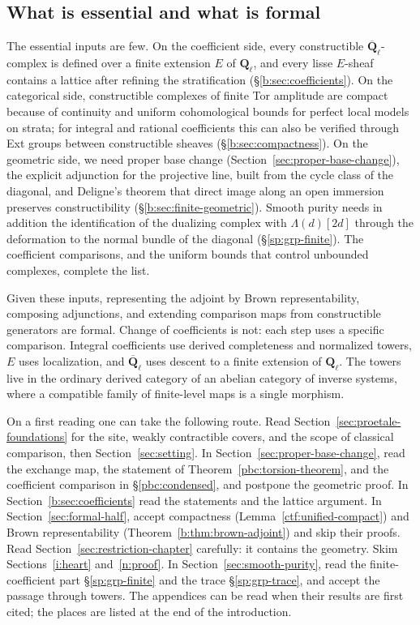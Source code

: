 \documentclass[11pt,a4paper]{article}
\numberwithin{equation}{section}
\theoremstyle{definition}
\theoremstyle{remark}
\newcommand{\Qbar}{\overline{\mathbf Q}_\ell}
\newcommand{\Ql}{\mathbf Q_\ell}
\begin{document}
\subsection{What is essential and what is formal}
The essential inputs are few. On the coefficient side, every
constructible $\Qbar$-complex is defined over a finite extension $E$ of
$\Ql$, and every lisse $E$-sheaf contains a lattice after refining the
stratification (\S\ref{b:sec:coefficients}). On the categorical side,
constructible complexes of finite Tor amplitude are compact because of
continuity and uniform cohomological bounds for perfect local models on
strata; for integral and rational coefficients this can also be
verified through Ext groups between constructible sheaves
(\S\ref{b:sec:compactness}). On the geometric side, we need proper base
change (Section~\ref{sec:proper-base-change}), the explicit adjunction
for the projective line, built from the cycle class of the diagonal,
and Deligne's theorem that direct image along an open immersion
preserves constructibility (\S\ref{b:sec:finite-geometric}). Smooth
purity needs in addition the identification of the dualizing complex
with $\Lambda(d)[2d]$ through the deformation to the normal bundle of
the diagonal (\S\ref{sp:grp-finite}). The coefficient comparisons, and
the uniform bounds that control unbounded complexes, complete the list.

Given these inputs, representing the adjoint by Brown representability,
composing adjunctions, and extending comparison maps from constructible
generators are formal. Change of coefficients is not: each step uses a
specific comparison. Integral coefficients use derived completeness and
normalized towers, $E$ uses localization, and $\Qbar$ uses descent to a
finite extension of $\Ql$. The towers live in the ordinary derived
category of an abelian category of inverse systems, where a compatible
family of finite-level maps is a single morphism.

On a first reading one can take the following route. Read
Section~\ref{sec:proetale-foundations} for the site, weakly contractible
covers, and the scope of classical comparison, then
Section~\ref{sec:setting}. In Section~\ref{sec:proper-base-change},
read the exchange map, the statement of Theorem~\ref{pbc:torsion-theorem},
and the coefficient comparison in \S\ref{pbc:condensed}, and postpone
the geometric proof. In Section~\ref{b:sec:coefficients} read
the statements and the lattice argument. In Section~\ref{sec:formal-half},
accept compactness (Lemma~\ref{ctf:unified-compact}) and
Brown representability (Theorem~\ref{b:thm:brown-adjoint}) and skip
their proofs. Read Section~\ref{sec:restriction-chapter} carefully: it
contains the geometry. Skim Sections~\ref{i:heart} and~\ref{n:proof}.
In Section~\ref{sec:smooth-purity}, read the finite-coefficient part
\S\ref{sp:grp-finite} and the trace \S\ref{sp:grp-trace}, and accept the
passage through towers. The appendices can be read when their
results are first cited; the places are listed at the end of the
introduction.
\end{document}

